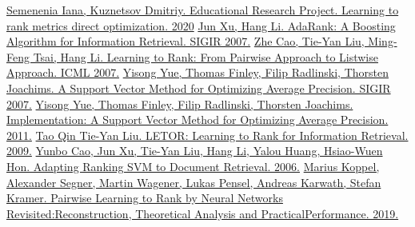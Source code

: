 \documentclass{article}[16pt]
\begin{document}
	\begin{thebibliography}{0}
		\hypertarget{source}{}
		\href{https://github.com/ElDmitro/Learning2Rank}
		{Semenenia Iana, Kuznetsov Dmitriy. Educational Research Project. Learning to rank metrics direct optimization. 2020}
		\hypertarget{adaRank}{}
		\href{http://www.bigdatalab.ac.cn/~junxu/publications/SIGIR2007_AdaRank.pdf}
		{Jun Xu, Hang Li. AdaRank: A Boosting Algorithm for Information Retrieval. SIGIR 2007.}
		\hypertarget{listnet}{}
		\href{https://www.microsoft.com/en-us/research/wp-content/uploads/2016/02/tr-2007-40.pdf}
		{Zhe Cao, Tie-Yan Liu, Ming-Feng Tsai, Hang Li. Learning to Rank: From Pairwise Approach to Listwise Approach. ICML 2007.}
		\hypertarget{svmmap}{}
		\href{https://www.cs.cornell.edu/people/tj/publications/yue_etal_07a.pdf}
		{Yisong Yue, Thomas Finley, Filip Radlinski, Thorsten Joachims. A Support Vector Method for Optimizing Average Precision. SIGIR 2007.}
		\hypertarget{svmmap_source}{}
		\href{https://www.cs.cornell.edu/people/tj/publications/yue_etal_07a.pdf}
		{Yisong Yue, Thomas Finley, Filip Radlinski, Thorsten Joachims. Implementation: A Support Vector Method for Optimizing Average Precision. 2011.}
		\hypertarget{letor}{}
		\href{https://www.microsoft.com/en-us/research/project/letor-learning-rank-information-retrieval/}
		{Tao Qin Tie-Yan Liu. LETOR: Learning to Rank for Information Retrieval. 2009.}
		\hypertarget{arsvm}{}
		\href{https://www.microsoft.com/en-us/research/publication/adapting-ranking-svm-document-retrieval/}
		{Yunbo Cao, Jun Xu, Tie-Yan Liu, Hang Li, Yalou Huang, Hsiao-Wuen Hon. Adapting Ranking SVM to Document Retrieval. 2006.}
		\hypertarget{last}{}
		\href{https://arxiv.org/pdf/1909.02768.pdf}
		{Marius Koppel, Alexander Segner, Martin Wagener, Lukas Pensel, Andreas Karwath, Stefan Kramer. Pairwise Learning to Rank by Neural Networks Revisited:Reconstruction, Theoretical Analysis and PracticalPerformance. 2019.}
	\end{thebibliography}
\end{document}
